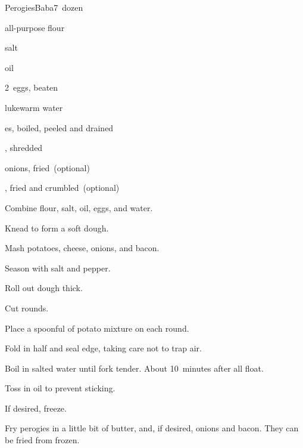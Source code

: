 \begin{recipe}{Perogies}{Baba}{7~dozen}

\begin{ingredients}
\item {} all-purpose flour
\item \tp{1\half} salt
\item {} oil
\item 2~eggs, beaten
\item \C{1\half} lukewarm water
\item \lbs{2\half} es, boiled, peeled and drained
\item \lbs{\half} , shredded
\item onions, fried~(optional)
\item {}, fried and crumbled~(optional)
\end{ingredients}

\begin{directions}
\item Combine flour, salt, oil, eggs, and water.
\item Knead to form a soft dough.
\item Mash potatoes, cheese, onions, and bacon.
\item Season with salt and pepper.
\item Roll out dough \inch{\eighth} thick.
\item Cut  rounds.
\item Place a spoonful of potato mixture on each round.
\item Fold in half and seal edge, taking care not to trap air.
\item Boil in salted water until fork tender. About 10~minutes after all float.
\item Toss in oil to prevent sticking.
\item If desired, freeze.
\item Fry perogies in a little bit of butter, and, if desired, onions and bacon. They can be fried from frozen.
\end{directions}

\end{recipe}
